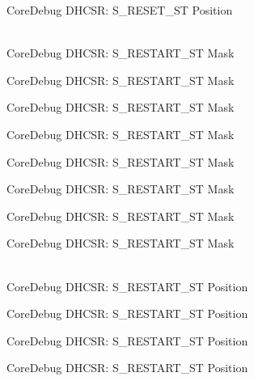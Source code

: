 \begin{DoxyRefList}
\label{deprecated__deprecated000562}%
%
Core\+Debug DHCSR:\+ S\+\_\+\+RESET\+\_\+\+ST Position  
\item[{\parbox[t]{\linewidth}{Global \doxylink{group__CMSIS__SCB_gabe3254d40aaa482987ff31584d2a3240}{Core\+Debug\+\_\+\+DHCSR\+\_\+\+S\+\_\+\+RESTART\+\_\+\+ST\+\_\+\+Msk} }}]\hfill \\
\label{deprecated__deprecated000008}%
%
Core\+Debug DHCSR:\+ S\+\_\+\+RESTART\+\_\+\+ST Mask 

\label{deprecated__deprecated000108}%
%
Core\+Debug DHCSR:\+ S\+\_\+\+RESTART\+\_\+\+ST Mask 

\label{deprecated__deprecated000162}%
%
Core\+Debug DHCSR:\+ S\+\_\+\+RESTART\+\_\+\+ST Mask 

\label{deprecated__deprecated000247}%
%
Core\+Debug DHCSR:\+ S\+\_\+\+RESTART\+\_\+\+ST Mask 

\label{deprecated__deprecated000304}%
%
Core\+Debug DHCSR:\+ S\+\_\+\+RESTART\+\_\+\+ST Mask 

\label{deprecated__deprecated000380}%
%
Core\+Debug DHCSR:\+ S\+\_\+\+RESTART\+\_\+\+ST Mask 

\label{deprecated__deprecated000459}%
%
Core\+Debug DHCSR:\+ S\+\_\+\+RESTART\+\_\+\+ST Mask 

\label{deprecated__deprecated000561}%
%
Core\+Debug DHCSR:\+ S\+\_\+\+RESTART\+\_\+\+ST Mask  
\item[{\parbox[t]{\linewidth}{Global \doxylink{group__CMSIS__SCB_gaf6498d32dbe23b8d95a12d2fbc0a65f8}{Core\+Debug\+\_\+\+DHCSR\+\_\+\+S\+\_\+\+RESTART\+\_\+\+ST\+\_\+\+Pos} }}]\hfill \\
\label{deprecated__deprecated000007}%
%
Core\+Debug DHCSR:\+ S\+\_\+\+RESTART\+\_\+\+ST Position 

\label{deprecated__deprecated000107}%
%
Core\+Debug DHCSR:\+ S\+\_\+\+RESTART\+\_\+\+ST Position 

\label{deprecated__deprecated000161}%
%
Core\+Debug DHCSR:\+ S\+\_\+\+RESTART\+\_\+\+ST Position 

\label{deprecated__deprecated000246}%
%
Core\+Debug DHCSR:\+ S\+\_\+\+RESTART\+\_\+\+ST Position 


\end{DoxyRefList}
